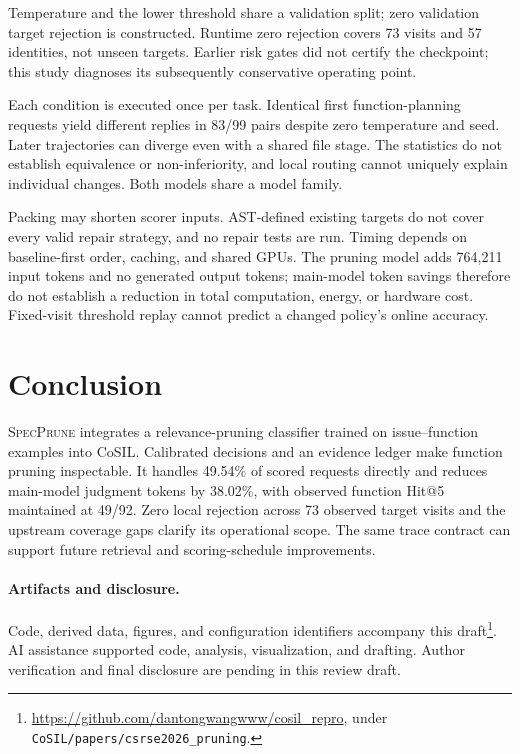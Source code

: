 \documentclass{svproc}
\newcommand{\specprune}{\textsc{SpecPrune}}
\begin{document}
Temperature and the lower threshold share a validation split; zero validation target rejection is constructed. Runtime zero rejection covers 73 visits and 57 identities, not unseen targets. Earlier risk gates did not certify the checkpoint; this study diagnoses its subsequently conservative operating point.

Each condition is executed once per task. Identical first function-planning requests yield different replies in 83/99 pairs despite zero temperature and seed. Later trajectories can diverge even with a shared file stage. The statistics do not establish equivalence or non-inferiority, and local routing cannot uniquely explain individual changes. Both models share a model family.

Packing may shorten scorer inputs. AST-defined existing targets do not cover every valid repair strategy, and no repair tests are run. Timing depends on baseline-first order, caching, and shared GPUs. The pruning model adds 764,211 input tokens and no generated output tokens; main-model token savings therefore do not establish a reduction in total computation, energy, or hardware cost. Fixed-visit threshold replay cannot predict a changed policy's online accuracy.

\section{Conclusion}
\specprune{} integrates a relevance-pruning classifier trained on issue--function examples into CoSIL. Calibrated decisions and an evidence ledger make function pruning inspectable. It handles 49.54\% of scored requests directly and reduces main-model judgment tokens by 38.02\%, with observed function Hit@5 maintained at 49/92. Zero local rejection across 73 observed target visits and the upstream coverage gaps clarify its operational scope. The same trace contract can support future retrieval and scoring-schedule improvements.

\paragraph{Artifacts and disclosure.}
Code, derived data, figures, and configuration identifiers accompany this draft\footnote{\url{https://github.com/dantongwangwww/cosil_repro}, under \texttt{CoSIL/papers/csrse2026\_pruning}.}. AI assistance supported code, analysis, visualization, and drafting. Author verification and final disclosure are pending in this review draft.



\end{document}
